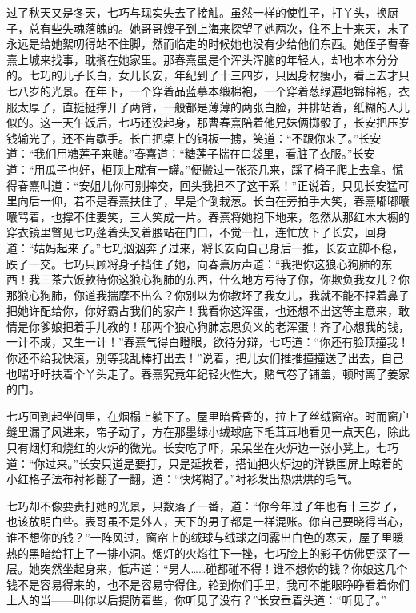 \par 过了秋天又是冬天，七巧与现实失去了接触。虽然一样的使性子，打丫头，换厨子，总有些失魂落魄的。她哥哥嫂子到上海来探望了她两次，住不上十来天，末了永远是给她絮叨得站不住脚，然而临走的时候她也没有少给他们东西。她侄子曹春熹上城来找事，耽搁在她家里。那春熹虽是个浑头浑脑的年轻人，却也本本分分的。七巧的儿子长白，女儿长安，年纪到了十三四岁，只因身材瘦小，看上去才只七八岁的光景。在年下，一个穿着品蓝摹本缎棉袍，一个穿着葱绿遍地锦棉袍，衣服太厚了，直挺挺撑开了两臂，一般都是薄薄的两张白脸，并排站着，纸糊的人儿似的。这一天午饭后，七巧还没起身，那曹春熹陪着他兄妹俩掷骰子，长安把压岁钱输光了，还不肯歇手。长白把桌上的铜板一掳，笑道：“不跟你来了。”长安道：“我们用糖莲子来赌。”春熹道：“糖莲子揣在口袋里，看脏了衣服。”长安道：“用瓜子也好，柜顶上就有一罐。”便搬过一张茶几来，踩了椅子爬上去拿。慌得春熹叫道：“安姐儿你可别摔交，回头我担不了这干系！”正说着，只见长安猛可里向后一仰，若不是春熹扶住了，早是个倒栽葱。长白在旁拍手大笑，春熹嘟嘟囔囔骂着，也撑不住要笑，三人笑成一片。春熹将她抱下地来，忽然从那红木大橱的穿衣镜里瞥见七巧蓬着头叉着腰站在门口，不觉一怔，连忙放下了长安，回身道：“姑妈起来了。”七巧汹汹奔了过来，将长安向自己身后一推，长安立脚不稳，跌了一交。七巧只顾将身子挡住了她，向春熹厉声道：“我把你这狼心狗肺的东西！我三茶六饭款待你这狼心狗肺的东西，什么地方亏待了你，你欺负我女儿？你那狼心狗肺，你道我揣摩不出么？你别以为你教坏了我女儿，我就不能不捏着鼻子把她许配给你，你好霸占我们的家产！我看你这浑蛋，也还想不出这等主意来，敢情是你爹娘把着手儿教的！那两个狼心狗肺忘恩负义的老浑蛋！齐了心想我的钱，一计不成，又生一计！”春熹气得白瞪眼，欲待分辩，七巧道：“你还有脸顶撞我！你还不给我快滚，别等我乱棒打出去！”说着，把儿女们推推撞撞送了出去，自己也喘吁吁扶着个丫头走了。春熹究竟年纪轻火性大，赌气卷了铺盖，顿时离了姜家的门。
\par 七巧回到起坐间里，在烟榻上躺下了。屋里暗昏昏的，拉上了丝绒窗帘。时而窗户缝里漏了风进来，帘子动了，方在那墨绿小绒球底下毛茸茸地看见一点天色，除此只有烟灯和烧红的火炉的微光。长安吃了吓，呆呆坐在火炉边一张小凳上。七巧道：“你过来。”长安只道是要打，只是延挨着，搭讪把火炉边的洋铁围屏上晾着的小红格子法布衬衫翻了一翻，道：“快烤糊了。”衬衫发出热烘烘的毛气。
\par 七巧却不像要责打她的光景，只数落了一番，道：“你今年过了年也有十三岁了，也该放明白些。表哥虽不是外人，天下的男子都是一样混账。你自己要晓得当心，谁不想你的钱？”一阵风过，窗帘上的绒球与绒球之间露出白色的寒天，屋子里暖热的黑暗给打上了一排小洞。烟灯的火焰往下一挫，七巧脸上的影子仿佛更深了一层。她突然坐起身来，低声道：“男人……碰都碰不得！谁不想你的钱？你娘这几个钱不是容易得来的，也不是容易守得住。轮到你们手里，我可不能眼睁睁看着你们上人的当——叫你以后提防着些，你听见了没有？”长安垂着头道：“听见了。”
